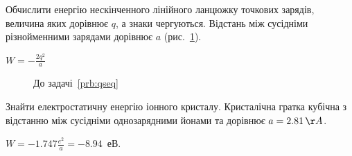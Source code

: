 \begin{problem}\label{prb:qseq}
Обчислити енергію нескінченного лінійного ланцюжку точкових зарядів, величина яких дорівнює $q$, а знаки чергуються. Відстань між сусідніми різнойменними зарядами дорівнює $a$ (рис.~\ref{qseq}).
\begin{solution}
	$W = - \frac{2q^2}{a}$
\end{solution}
\end{problem}
\begin{figure}[h!]\centering
	\caption{До задачі~\ref{prb:qseq}}
	\label{qseq}
\end{figure}

\begin{problem}
    Знайти електростатичну енергію іонного кристалу. Кристалічна гратка  кубічна з відстанню між сусідніми однозарядними йонами  та  дорівнює $a = 2.81\,\AA$.
\begin{solution}
	$W = -1.747\frac{e^2}{a} = -8.94$~еВ.
\end{solution}
\end{problem}

